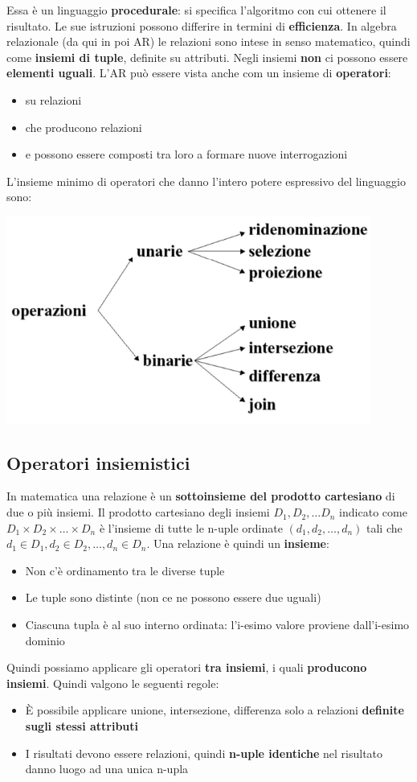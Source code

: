 \documentclass[12pt]{article}
\begin{document}
Essa è un linguaggio \textbf{procedurale}: si specifica l'algoritmo con cui ottenere il risultato.
Le sue istruzioni possono differire in termini di \textbf{efficienza}.
In algebra relazionale (da qui in poi AR) le relazioni sono intese in senso matematico, quindi come \textbf{insiemi di tuple}, definite su attributi.
Negli insiemi \textbf{non} ci possono essere \textbf{elementi uguali}.
L'AR può essere vista anche com un insieme di \textbf{operatori}:
\begin{itemize}
    \item su relazioni
    \item che producono relazioni
    \item e possono essere composti tra loro a formare nuove interrogazioni
\end{itemize}
L'insieme minimo di operatori che danno l'intero potere espressivo del linguaggio sono:
\begin{center}
    \includegraphics[width = 0.90\textwidth]{Images/124.PNG}
\end{center}
\subsection{Operatori insiemistici}
In matematica una relazione è un \textbf{sottoinsieme del prodotto cartesiano} di due o più insiemi.
Il prodotto cartesiano degli insiemi $D_1, D_2, \dots D_n$ indicato come $D_1 \times D_2 \times \dots \times D_n$ è l'insieme di tutte le n-uple ordinate $(d_1, d_2, \dots, d_n)$ tali che
$d_1 \in D_1, d_2 \in D_2, \dots, d_n \in D_n$.
Una relazione è quindi un \textbf{insieme}:
\begin{itemize}
    \item Non c'è ordinamento tra le diverse tuple
    \item Le tuple sono distinte (non ce ne possono essere due uguali)
    \item Ciascuna tupla è al suo interno ordinata: l'i-esimo valore proviene dall'i-esimo dominio
\end{itemize}
Quindi possiamo applicare gli operatori \textbf{tra insiemi}, i quali \textbf{producono insiemi}.
Quindi valgono le seguenti regole:
\begin{itemize}
    \item È possibile applicare unione, intersezione, differenza solo a relazioni \textbf{definite sugli stessi attributi}
    \item I risultati devono essere relazioni, quindi \textbf{n-uple identiche} nel risultato danno luogo ad una unica n-upla
\end{itemize}
\end{document}
